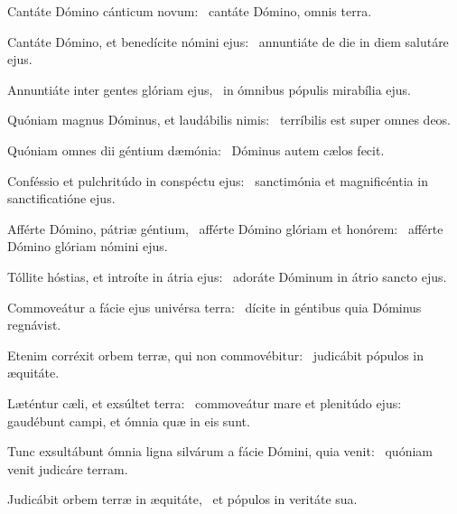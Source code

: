 \item Cantáte Dómino cánticum novum:~\psstar{} cantáte Dómino, omnis terra.

\item Cantáte Dómino, et benedícite nómini ejus:~\psstar{} annuntiáte de die in diem salutáre ejus.

\item Annuntiáte inter gentes glóriam ejus,~\psstar{} in ómnibus pópulis mirabília ejus.

\item Quóniam magnus Dóminus, et laudábilis nimis:~\psstar{} terríbilis est super omnes deos.

\item Quóniam omnes dii géntium dæmónia:~\psstar{} Dóminus autem cælos fecit.

\item Conféssio et pulchritúdo in conspéctu ejus:~\psstar{} sanctimónia et magnificéntia in sanctificatióne ejus.

\item Afférte Dómino, pátriæ géntium,~\pscross{} afférte Dómino glóriam et honórem:~\psstar{} afférte Dómino glóriam nómini ejus.

\item Tóllite hóstias, et introíte in átria ejus:~\psstar{} adoráte Dóminum in átrio sancto ejus.

\item Commoveátur a fácie ejus univérsa terra:~\psstar{} dícite in géntibus quia Dóminus regnávist.

\item Etenim corréxit orbem terræ, qui non commovébitur:~\psstar{} judicábit pópulos in æquitáte.

\item Læténtur cæli, et exsúltet terra:~\pscross{} commoveátur mare et plenitúdo ejus:~\psstar{} gaudébunt campi, et ómnia quæ in eis sunt.

\item Tunc exsultábunt ómnia ligna silvárum a fácie Dómini, quia venit:~\psstar{} quóniam venit judicáre terram.

\item Judicábit orbem terræ in æquitáte,~\psstar{} et pópulos in veritáte sua.
